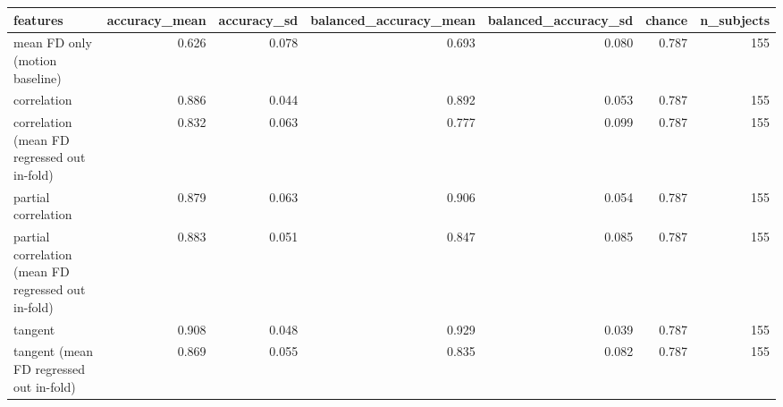 \begin{tabular}{lrrrrrr}
\toprule
features & accuracy_mean & accuracy_sd & balanced_accuracy_mean & balanced_accuracy_sd & chance & n_subjects \\
\midrule
mean FD only (motion baseline) & 0.626 & 0.078 & 0.693 & 0.080 & 0.787 & 155 \\
correlation & 0.886 & 0.044 & 0.892 & 0.053 & 0.787 & 155 \\
correlation (mean FD regressed out in-fold) & 0.832 & 0.063 & 0.777 & 0.099 & 0.787 & 155 \\
partial correlation & 0.879 & 0.063 & 0.906 & 0.054 & 0.787 & 155 \\
partial correlation (mean FD regressed out in-fold) & 0.883 & 0.051 & 0.847 & 0.085 & 0.787 & 155 \\
tangent & 0.908 & 0.048 & 0.929 & 0.039 & 0.787 & 155 \\
tangent (mean FD regressed out in-fold) & 0.869 & 0.055 & 0.835 & 0.082 & 0.787 & 155 \\
\bottomrule
\end{tabular}
